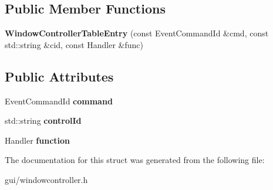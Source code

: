 \subsection*{Public Member Functions}
\begin{DoxyCompactItemize}
\item 
{\bfseries Window\+Controller\+Table\+Entry} (const Event\+Command\+Id \&cmd, const std\+::string \&cid, const Handler \&func)\hypertarget{structWindowControllerTableEntry_a0c22e04783d5d98853e9e89a61b3ad2d}{}\label{structWindowControllerTableEntry_a0c22e04783d5d98853e9e89a61b3ad2d}

\end{DoxyCompactItemize}
\subsection*{Public Attributes}
\begin{DoxyCompactItemize}
\item 
Event\+Command\+Id {\bfseries command}\hypertarget{structWindowControllerTableEntry_acf7368b172c466da76349bd0208714fc}{}\label{structWindowControllerTableEntry_acf7368b172c466da76349bd0208714fc}

\item 
std\+::string {\bfseries control\+Id}\hypertarget{structWindowControllerTableEntry_a93b1a9bd3e2fba66a0995cead5f935ef}{}\label{structWindowControllerTableEntry_a93b1a9bd3e2fba66a0995cead5f935ef}

\item 
Handler {\bfseries function}\hypertarget{structWindowControllerTableEntry_a189610c809e84d2e1c5c58caa0689f01}{}\label{structWindowControllerTableEntry_a189610c809e84d2e1c5c58caa0689f01}

\end{DoxyCompactItemize}


The documentation for this struct was generated from the following file\+:\begin{DoxyCompactItemize}
\item 
gui/windowcontroller.\+h\end{DoxyCompactItemize}
